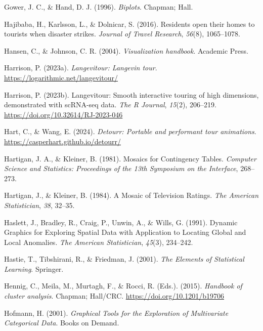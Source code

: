 \documentclass[
  letterpaper,
]{krantz}
\newlength{\cslhangindent}
\newenvironment{CSLReferences}[2] %
 {\begin{list}{}{%
  \setlength{\itemindent}{0pt}
  \setlength{\leftmargin}{0pt}
  \setlength{\parsep}{0pt}
  \ifodd #1
   \setlength{\leftmargin}{\cslhangindent}
   \setlength{\itemindent}{-1\cslhangindent}
  \fi
  \setlength{\itemsep}{#2\baselineskip}}}
 {\end{list}}
\begin{document}
\begin{CSLReferences}{1}{0}
Gower, J. C., \& Hand, D. J. (1996). \emph{Biplots}. Chapman; Hall.

Hajibaba, H., Karlsson, L., \& Dolnicar, S. (2016). Residents open their
homes to tourists when disaster strikes. \emph{Journal of Travel
Research}, \emph{56}(8), 1065--1078.

Hansen, C., \& Johnson, C. R. (2004). \emph{Visualization handbook}.
Academic Press.

Harrison, P. (2023a). \emph{Langevitour: Langevin tour}.
\url{https://logarithmic.net/langevitour/}

Harrison, P. (2023b). Langevitour: Smooth interactive touring of high
dimensions, demonstrated with scRNA-seq data. \emph{The R Journal},
\emph{15}(2), 206--219. \url{https://doi.org/10.32614/RJ-2023-046}

Hart, C., \& Wang, E. (2024). \emph{Detourr: Portable and performant
tour animations}. \url{https://casperhart.github.io/detourr/}

Hartigan, J. A., \& Kleiner, B. (1981). Mosaics for {C}ontingency
{T}ables. \emph{Computer Science and Statistics: Proceedings of the 13th
Symposium on the Interface}, 268--273.

Hartigan, J., \& Kleiner, B. (1984). A {M}osaic of {T}elevision
{R}atings. \emph{The American Statistician}, \emph{38}, 32--35.

Haslett, J., Bradley, R., Craig, P., Unwin, A., \& Wills, G. (1991).
{D}ynamic {G}raphics for {E}xploring {S}patial {D}ata with {A}pplication
to {L}ocating {G}lobal and {L}ocal {A}nomalies. \emph{The American
Statistician}, \emph{45}(3), 234--242.

Hastie, T., Tibshirani, R., \& Friedman, J. (2001). \emph{The {E}lements
of {S}tatistical {L}earning}. Springer.

Hennig, C., Meila, M., Murtagh, F., \& Rocci, R. (Eds.). (2015).
\emph{Handbook of cluster analysis}. Chapman; Hall/{CRC}.
\url{https://doi.org/10.1201/b19706}

Hofmann, H. (2001). \emph{Graphical {T}ools for the {E}xploration of
{M}ultivariate {C}ategorical {D}ata}. Books on Demand.


\end{CSLReferences}
\end{document}
